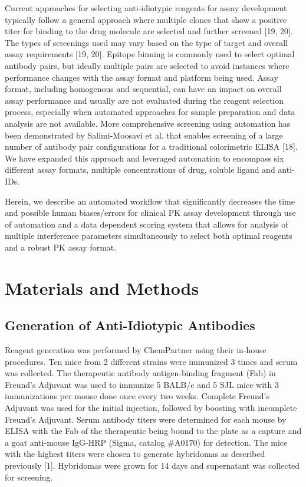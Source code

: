 Current approaches for selecting anti-idiotypic reagents for assay development typically follow a general approach where multiple clones that show a positive titer for binding to the drug molecule are selected and further screened [19, 20].  The types of screenings used may vary based on the type of target and overall assay requirements [19, 20].  Epitope binning is commonly used to select optimal antibody pairs, but ideally multiple pairs are selected to avoid instances where performance changes with the assay format and platform being used.  Assay format, including homogenous and sequential, can have an impact on overall assay performance and usually are not evaluated during the reagent selection process, especially when automated approaches for sample preparation and data analysis are not available.  More comprehensive screening using automation has been demonstrated by Salimi-Moosavi et al. that enables screening of a large number of antibody pair configurations for a traditional colorimetric ELISA [18].  We have expanded this approach and leveraged automation to encompass six different assay formats, multiple concentrations of drug, soluble ligand and anti-IDs.

Herein, we describe an automated workflow that significantly decreases the time and possible human biases/errors for clinical PK assay development through use of automation and a data dependent scoring system that allows for analysis of multiple interference parameters simultaneously to select both optimal reagents and a robust PK assay format.  


\section{Materials and Methods}
\subsection{Generation of Anti-Idiotypic Antibodies}
Reagent generation was performed by ChemPartner using their in-house procedures.  Ten mice from 2 different strains were immunized 3 times and serum was collected.  The therapeutic antibody antigen-binding fragment (Fab) in Freund’s Adjuvant was used to immunize 5 BALB/c and 5 SJL mice with 3 immunizations per mouse done once every two weeks.  Complete Freund’s Adjuvant was used for the initial injection, followed by boosting with incomplete Freund’s Adjuvant. Serum antibody titers were determined for each mouse by ELISA with the Fab of the therapeutic being bound to the plate as a capture and a goat anti-mouse IgG-HRP (Sigma, catalog #A0170) for detection.  The mice with the highest titers were chosen to generate hybridomas as described previously [1].  Hybridomas were grown for 14 days and supernatant was collected for screening.  
